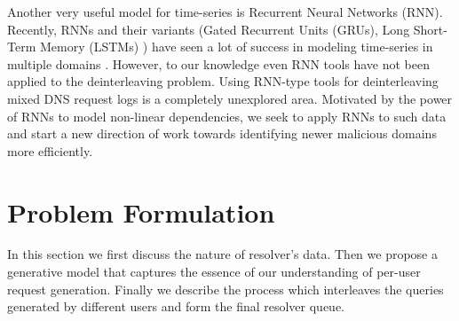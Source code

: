 \documentclass[conference]{IEEEtran}
\begin{document}
	Another very useful model for time-series is Recurrent Neural Networks (RNN). 
	Recently, RNNs and their variants (Gated  Recurrent  Units  (GRUs)\cite{chung2014empirical},  Long  Short-Term  Memory  (LSTMs)  \cite{Hochreiter}) have seen a lot of success in modeling time-series in multiple domains  \cite{bahdanau2014neural, NIPS2008_3449, sutskever2014sequence}. 
	However, to our knowledge even RNN tools have not been applied to the deinterleaving problem. %
	Using RNN-type tools for deinterleaving mixed DNS request logs is a completely unexplored area. 
	Motivated by the power of RNNs to model non-linear dependencies, we seek to apply RNNs to such data and start a new direction of work towards identifying newer malicious domains more efficiently.
	
	
	
	\section{Problem Formulation}
	\label{sec:gen}
	In this section we first discuss the nature of resolver's data.
	Then we propose a generative model that captures the essence of our understanding of per-user request generation.
	Finally we describe the process which interleaves the queries generated by different users and form the final resolver queue. 
	
\end{document}
